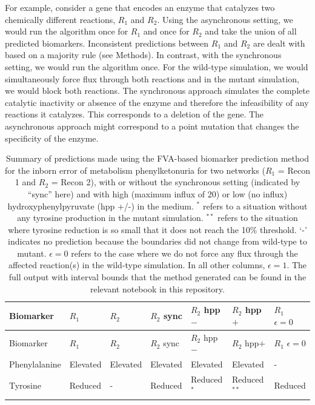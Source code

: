 \documentclass[10pt,a4paper,onecolumn]{article}
\begin{document}
For example, consider a gene that encodes an enzyme that catalyzes two
chemically different reactions, \(R_1\) and \(R_2\). Using the
asynchronous setting, we would run the algorithm once for \(R_1\) and
once for \(R_2\) and take the union of all predicted biomarkers.
Inconsistent predictions between \(R_1\) and \(R_2\) are dealt with
based on a majority rule (see Methods). In contrast, with the
synchronous setting, we would run the algorithm once. For the wild-type
simulation, we would simultaneously force flux through both reactions
and in the mutant simulation, we would block both reactions. The
synchronous approach simulates the complete catalytic inactivity or
absence of the enzyme and therefore the infeasibility of any reactions
it catalyzes. This corresponds to a deletion of the gene. The
asynchronous approach might correspond to a point mutation that changes
the specificity of the enzyme.

\begin{longtable}[]{@{}lllllll@{}}
\caption{\label{tbl:PKU_results}Summary of predictions made using the
FVA-based biomarker prediction method for the inborn error of metabolism
phenylketonuria for two networks (\(R_1\) = Recon 1 and \(R_2\) = Recon
2), with or without the synchronous setting (indicated by ``sync'' here)
and with high (maximum influx of 20) or low (no influx)
hydroxyphenylpyruvate (hpp +/-) in the medium. \(^*\) refers to a
situation without any tyrosine production in the mutant simulation.
\(^{**}\) refers to the situation where tyrosine reduction is so small
that it does not reach the 10\% threshold. `-' indicates no prediction
because the boundaries did not change from wild-type to mutant.
\(\epsilon = 0\) refers to the case where we do not force any flux
through the affected reaction(s) in the wild-type simulation. In all
other columns, \(\epsilon = 1\). The full output with interval bounds
that the method generated can be found in the relevant notebook in this
repository. }\tabularnewline
\toprule
Biomarker & \(R_1\) & \(R_2\) & \(R_2\) sync & \(R_2\) hpp\(-\) &
\(R_2\) hpp\(+\) & \(R_1\) \(\epsilon = 0\)\tabularnewline
\midrule
\endfirsthead
\toprule
Biomarker & \(R_1\) & \(R_2\) & \(R_2\) sync & \(R_2\) hpp\(-\) &
\(R_2\) hpp\(+\) & \(R_1\) \(\epsilon = 0\)\tabularnewline
\midrule
\endhead
Phenylalanine & Elevated & Elevated & Elevated & Elevated & Elevated &
-\tabularnewline
Tyrosine & Reduced & - & Reduced & Reduced\(^*\) & Reduced\(^{**}\) &
Reduced\tabularnewline
\bottomrule
\end{longtable}
\end{document}
